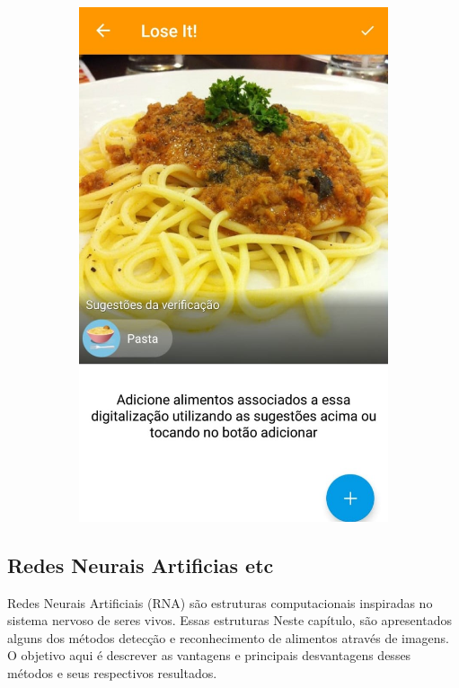 \begin{figure}[!ht]
\begin{subfigure}{0.4\textwidth}
  \includegraphics[width=\textwidth]{imgs/loseit.jpeg}
  \label{fig:subApps2}
\end{subfigure}

\label{fig:test}
\end{figure}


\subsection{Redes Neurais Artificias etc \label{subsec:nn}}

Redes Neurais Artificiais (RNA) são estruturas computacionais inspiradas no sistema nervoso de seres vivos. Essas estruturas
Neste capítulo, são apresentados alguns dos métodos detecção e reconhecimento de alimentos através de imagens. O objetivo aqui é descrever as vantagens e principais desvantagens desses métodos e seus respectivos resultados. 


